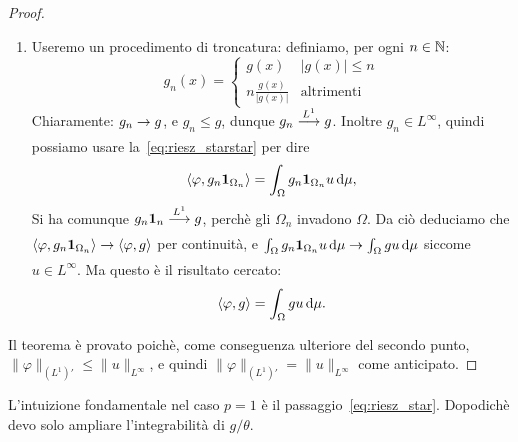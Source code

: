 \begin{proof}
\begin{enumerate}
		\item Useremo un procedimento di troncatura: definiamo, per ogni $n \in \mathbb{N}$:
		\begin{equation*}
			g_n(x) = \begin{cases}
				g(x) & |g(x)| \leq n\\
				n \frac{g(x)}{|g(x)|} & \text{altrimenti}
			\end{cases}
		\end{equation*}
		Chiaramente: $g_n \underset{{}}{\rightarrow} g$, e $g_n \leq g$, dunque $g_n \overset{L^1}{\underset{{}}{\longrightarrow}} g$. Inoltre $g_n \in L^\infty$, quindi possiamo usare la~\eqref{eq:riesz_starstar} per dire
		\begin{equation*}
			\langle \varphi, g_n {\boldsymbol{1}}_{\Omega_n} \rangle = \int_\Omega g_n {\boldsymbol{1}}_{\Omega_n} u \,\mathrm{d}\mu,
		\end{equation*}
		Si ha comunque $g_n {\boldsymbol{1}}_n \overset{L^1}{\underset{{}}{\longrightarrow}} g$, perchè gli $\Omega_n$ invadono $\Omega$.
		Da ciò deduciamo che $\langle \varphi, g_n {\boldsymbol{1}}_{\Omega_n} \rangle \underset{{}}{\rightarrow} \langle \varphi, g \rangle$ per continuità, e $\int_\Omega  g_n {\boldsymbol{1}}_{\Omega_n} u \,\mathrm{d}\mu \underset{{}}{\rightarrow} \int_\Omega g u \,\mathrm{d}\mu$ siccome $u \in L^\infty$. Ma questo è il risultato cercato:
		\begin{equation*}
			\langle \varphi, g \rangle = \int_\Omega gu\,\mathrm{d}\mu.
		\end{equation*}
	\end{enumerate}
	Il teorema è provato poichè, come conseguenza ulteriore del secondo punto, $\|\varphi\|_{(L^1)'} \leq \|u\|_{L^\infty}$, e quindi $\|\varphi\|_{(L^1)'}=\|u\|_{L^\infty}$ come anticipato.
\end{proof}

\begin{remark}
	L'intuizione fondamentale nel caso $p=1$ è il passaggio~\eqref{eq:riesz_star}. Dopodichè devo solo ampliare l'integrabilità di $g/\theta$.
\end{remark}

